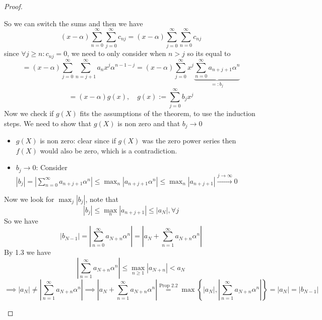 \documentclass[a4paper]{article}
\theoremstyle{plain}
\theoremstyle{definition}
\begin{document}
\begin{proof}
\begin{itemize}
\begin{enumerate}
          \end{enumerate}
          So we can switch the sums and then we have
          $$(x-\alpha) \sum_{n=0}^{\infty} \sum_{j=0}^{\infty} c_{nj} = (x-\alpha) \sum_{j=0}^{\infty} \sum_{n=0}^{\infty} c_{nj}$$
          since $\forall j \geq n:c_{nj} = 0$, we need to only consider when $n > j$ so its equal to
          $$= (x-\alpha) \sum_{j=0}^{\infty} \sum_{n=j+1}^{\infty} a_{n}x^{j}\alpha^{n-1-j} = (x-\alpha) \sum_{j=0}^{\infty} x^{j} \underbrace{\sum_{n=0}^{\infty} a_{n+j+1}\alpha^{n}}_{=:b_{j}}$$
          $$= (x-\alpha)g(x),\quad g(x):=\sum_{j=0}^{\infty}b_{j}x^{j}$$
          Now we check if $g(X)$ fits the assumptions of the theorem, to use the induction steps. We need to show that $g(X)$ is non zero and that $b_{j} \to 0$
          \begin{itemize}
            \item $g(X)$ is non zero: clear since if $g(X)$ was the zero power series then $f(X)$ would also be zero, which is a contradiction.
            \item $b_{j} \to 0$: Consider $|b_{j}| = \left|\sum_{n=0}^{\infty}a_{n+j+1}\alpha^{n}\right| \leq \max_{n}|a_{n+j+1}\alpha^{n}| \leq \max_{n}|a_{n+j+1}| \xrightarrow{j \to \infty} 0$
          \end{itemize}
          Now we look for $\max_{j}|b_{j}|$, note that
          $$|b_{j}| \leq \max_{n}|a_{n+j+1}| \leq |a_{N}|, \forall j$$
          So we have
          $$|b_{N-1}| = \left|\sum_{n = 0}^{\infty}a_{N+n}\alpha^{n}\right| = \left| a_{N} + \sum_{n=1}^{\infty}a_{N+n}\alpha^{n}\right|$$
          By 1.3 we have
          $$\left| \sum_{n = 1}^{\infty}a_{N+n}\alpha^{n}\right| \leq \max_{n \geq 1}|a_{N+n}| < a_{N}$$
          $$\implies |a_{N}| \neq \left| \sum_{n = 1}^{\infty}a_{N+n}\alpha^{n}\right| \implies \left| a_{N} + \sum_{n=1}^{\infty}a_{N+n}\alpha^{n}\right| \overset{\text{Prop } 2.2}= \max\left\{|a_{N}|, \left| \sum_{n = 1}^{\infty}a_{N+n}\alpha^{n}\right| \right\} = |a_{N}| = |b_{N-1}|$$

\end{itemize}
\end{proof}
\end{document}
